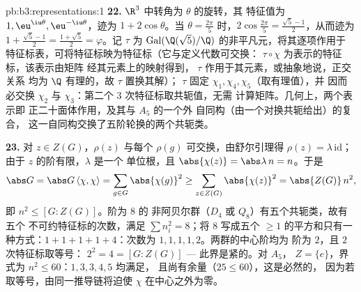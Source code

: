 \begin{solution}{pb:b3:representations:1}
\textbf{22.} $\R^3$ 中转角为 $\theta$ 的旋转，其
特征值为 $1, \eu^{\iu\theta}, \eu^{-\iu\theta}$，迹为 $1 +
2\cos\theta$。当 $\theta = \frac{2\pi}5$ 时，$2\cos\frac{2\pi}5
= \frac{\sqrt5 - 1}2$，从而迹为 $1 + \frac{\sqrt5-1}2 =
\frac{1+\sqrt5}2 = \varphi$。记 $\tau$ 为
$\operatorname{Gal}(\Q(\sqrt5)/\Q)$ 的非平凡元，将其逐项作用于
特征标表，可将特征标映为特征标（它与定义代数可交换：
$\tau\circ\chi$ 为表示的特征标，该表示由矩阵
经其元素上的映射得到，
$\tau$ 作用于其元素，或抽象地说，正交关系
均为 $\Q$ 有理的，故 $\tau$ 置换其解）；
$\tau$ 固定 $\chi_1, \chi_4, \chi_5$（取有理值），并
因而必交换 $\chi_2$ 与 $\chi_3$：第二个
$3$ 次特征标取共轭值，无需
计算矩阵。几何上，两个表示即
正二十面体作用，及其与 $A_5$ 的一个外
自同构（由一个对换共轭给出）的复合，
这一自同构交换了五阶轮换的两个共轭类。

\textbf{23.} 对 $z \in Z(G)$，$\rho(z)$ 与每个
$\rho(g)$ 可交换，由舒尔引理得 $\rho(z) = \lambda\,
\mathrm{id}$；由于 $z$ 的阶有限，$\lambda$ 是一个
单位根，且 $\abs{\chi(z)} = \abs\lambda\,n = n$。于是
\[
\abs G = \abs G\,\langle\chi, \chi\rangle
= \sum_{g \in G}\abs{\chi(g)}^2
\geq \sum_{z \in Z(G)}\abs{\chi(z)}^2
= \abs{Z(G)}\,n^2,
\]
即 $n^2 \leq [G : Z(G)]$。阶为 $8$ 的
非阿贝尔群（$D_4$ 或 $Q_8$）有五个共轭类，故有五个
不可约特征标的次数，满足 $\sum n_i^2 = 8$；将 $8$
写成五个 $\geq 1$ 的平方和只有一种方式：$1 + 1 + 1 + 1
+ 4$：次数为 $1, 1, 1, 1, 2$。两群的中心阶均为
阶为 $2$，且 $2$ 次特征标取等号：
$2^2 = 4 = [G : Z(G)]$ --- 此界是紧的。对 $A_5$，
$Z = \{e\}$，界式为 $n^2 \leq 60$：$1, 3, 3, 4, 5$ 均满足，
且尚有余量（$25 \leq 60$），这是必然的，
因为若取等号，由同一推导链将迫使 $\chi$
在中心之外为零。


\end{solution}
